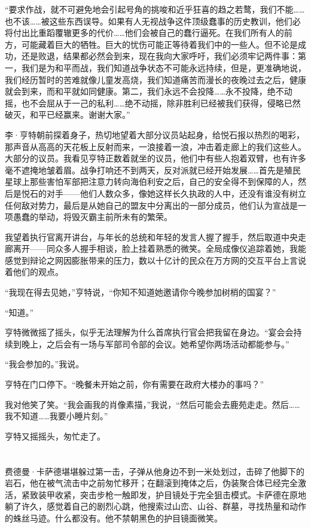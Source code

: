 \documentclass[AutoFakeBold=true]{book}
\begin{document}
``要求作战，就不可避免地会引起号角的挑唆和近乎狂喜的趋之若鹜，我们不能……也不该……被这些东西误导。如果有人无视战争这件顶级蠢事的历史教训，他们必将付出比重蹈覆辙更多的代价……他们会被自己的蠢行逼死。在我们所有人的前方，可能藏着巨大的牺牲。巨大的忧伤可能正等待着我们中的一些人。但不论是成功，还是败退，结果都必然会到来，现在我向大家呼吁，我们必须牢记两件事：第一，我们是为和平而战，我们知道战争状态不可能永远持续，但是，更准确地说，我们经历暂时的苦难就像儿童发高烧，我们知道痛苦而漫长的夜晚过去之后，健康就会到来，而和平就如同健康。第二，我们永远不会投降……永不投降，绝不动摇，也不会屈从于一己的私利……绝不动摇，除非胜利已经被我们获得，侵略已然破灭，和平已经赢来。谢谢大家。''

李·亨特朝前探着身子，热切地望着大部分议员站起身，给悦石报以热烈的喝彩，那声音从高高的天花板上反射而来，一浪接着一浪，冲击着走廊上的我们这些人。大部分的议员。我看见亨特正数着就坐的议员，他们中有些人抱着双臂，也有许多毫不遮掩地皱着眉。战争打响还不到两天，反对派就已经开始发展……首先是殖民星球上那些害怕军部把注意力转向海伯利安之后，自己的安全得不到保障的人，然后是悦石的对手——他们人数众多，像她这样长久执政的人中，还没有谁没有树立任何敌对势力，最后是从她自己的盟友中分离出的一部分成员，他们认为宣战是一项愚蠢的举动，将毁灭霸主前所未有的繁荣。

我望着执行官离开讲台，与年长的总统和年轻的发言人握了握手，然后取道中央走廊离开——同众多人握手相谈，脸上挂着熟悉的微笑。全局成像仪追踪着她，我能感觉到辩论之网因膨胀带来的压力，数以十亿计的民众在万方网的交互平台上言说着他们的观点。

``我现在得去见她，''亨特说，``你知不知道她邀请你今晚参加树梢的国宴？''

``知道。''

亨特微微摇了摇头，似乎无法理解为什么首席执行官会把我留在身边。``宴会会持续到晚上，之后会有一场与军部司令部的会议。她希望你两场活动都能参与。''

``我会参加的。''我说。

亨特在门口停下。``晚餐未开始之前，你有需要在政府大楼办的事吗？''

我对他笑了笑。``我会画我的肖像素描，''我说，``然后可能会去鹿苑走走。然后……我不知道……我要小睡片刻。''

亨特又摇摇头，匆忙走了。

\chapter{}

费德曼·卡萨德堪堪躲过第一击，子弹从他身边不到一米处划过，击碎了他脚下的岩石，他在被气流击中之前匆忙移开；在翻滚到掩体之后，伪装聚合体已经完全激活，紧致装甲收紧，突击步枪一触即发，护目镜处于完全狙击模式。卡萨德在原地躺了许久，感觉着自己的剧烈心跳，他搜索过山峦、山谷、群墓，寻找热量和动作的蛛丝马迹。什么都没有。他不禁朝黑色的护目镜面微笑。
\end{document}
